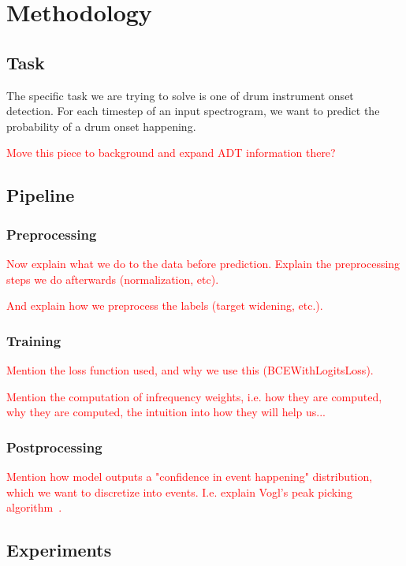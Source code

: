 \chapter{Methodology}

\section{Task}

The specific task we are trying to solve is one of drum instrument onset detection. For each timestep of an input spectrogram, we want to predict the probability of a drum onset happening.

\textcolor{red}{Move this piece to background and expand ADT information there?}

\section{Pipeline}

\subsection{Preprocessing}

\textcolor{red}{Now explain what we do to the data before prediction. Explain the preprocessing steps we do afterwards (normalization, etc).}

\textcolor{red}{And explain how we preprocess the labels (target widening, etc.).}

\subsection{Training}

\textcolor{red}{Mention the loss function used, and why we use this (BCEWithLogitsLoss).}

\textcolor{red}{Mention the computation of infrequency weights, i.e. how they are computed, why they are computed, the intuition into how they will help us...}

\subsection{Postprocessing}

\textcolor{red}{Mention how model outputs a "confidence in event happening" distribution, which we want to discretize into events.
I.e. explain Vogl's peak picking algorithm~\cite{vogl2018multiinstrumentdrumtranscription}.}

\section{Experiments}

